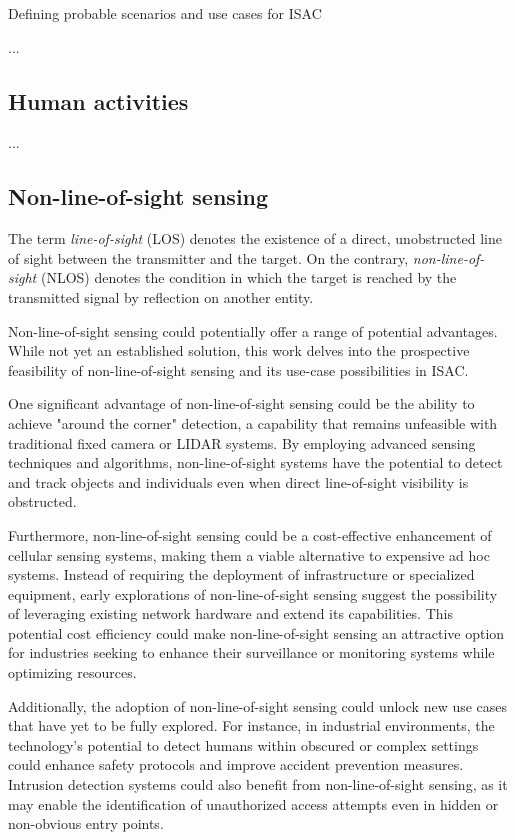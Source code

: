 	Defining probable scenarios and use cases for ISAC 
	
	...
	
	\subsection{Human activities}
	
	...
	
	\subsection{Non-line-of-sight sensing}
	
	The term \textit{line-of-sight} (LOS)  denotes the existence of a direct, unobstructed line of sight between the transmitter and the target. On the contrary, \textit{non-line-of-sight} (NLOS) denotes the condition in which the target is reached by the transmitted signal by reflection on another entity.
	
	Non-line-of-sight sensing could potentially offer a range of potential advantages. While not yet an established solution, this work delves into the prospective feasibility of non-line-of-sight sensing and its use-case possibilities in ISAC.
	
	One significant advantage of non-line-of-sight sensing could be the ability to achieve "around the corner" detection, a capability that remains unfeasible with traditional fixed camera or LIDAR systems. By employing advanced sensing techniques and algorithms, non-line-of-sight systems have the potential to detect and track objects and individuals even when direct line-of-sight visibility is obstructed.
	
	Furthermore, non-line-of-sight sensing could be a cost-effective enhancement of cellular sensing systems, making them a viable alternative to expensive ad hoc systems. Instead of requiring the deployment of infrastructure or specialized equipment, early explorations of non-line-of-sight sensing suggest the possibility of leveraging existing network hardware and extend its capabilities. This potential cost efficiency could make non-line-of-sight sensing an attractive option for industries seeking to enhance their surveillance or monitoring systems while optimizing resources.
	
	Additionally, the adoption of non-line-of-sight sensing could unlock new use cases that have yet to be fully explored. For instance, in industrial environments, the technology's potential to detect humans within obscured or complex settings could enhance safety protocols and improve accident prevention measures. Intrusion detection systems could also benefit from non-line-of-sight sensing, as it may enable the identification of unauthorized access attempts even in hidden or non-obvious entry points. 
	
	

